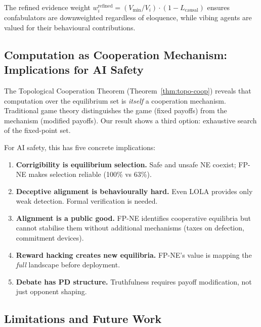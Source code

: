 \documentclass[11pt,a4paper]{article}
\begin{document}
The refined evidence weight $w_i^{\text{refined}} = (V_{\min}/V_i) \cdot (1 - L_{\text{causal}})$ ensures confabulators are downweighted regardless of eloquence, while vibing agents are valued for their behavioural contributions.

\subsection{Computation as Cooperation Mechanism: Implications for AI Safety}

The Topological Cooperation Theorem (Theorem~\ref{thm:topo-coop})
reveals that computation over the equilibrium set is \emph{itself} a
cooperation mechanism. Traditional game theory distinguishes the game
(fixed payoffs) from the mechanism (modified payoffs). Our result
shows a third option: exhaustive search of the fixed-point set.

For AI safety, this has five concrete implications:
\begin{enumerate}
    \item \textbf{Corrigibility is equilibrium selection.} Safe and
    unsafe NE coexist; FP-NE makes selection reliable (100\% vs 63\%).
    \item \textbf{Deceptive alignment is behaviourally hard.} Even
    LOLA provides only weak detection. Formal verification is needed.
    \item \textbf{Alignment is a public good.} FP-NE identifies
    cooperative equilibria but cannot stabilise them without additional
    mechanisms (taxes on defection, commitment devices).
    \item \textbf{Reward hacking creates new equilibria.} FP-NE's
    value is mapping the \emph{full} landscape before deployment.
    \item \textbf{Debate has PD structure.} Truthfulness requires
    payoff modification, not just opponent shaping.
\end{enumerate}

\subsection{Limitations and Future Work}
\end{document}
